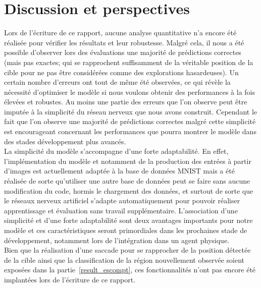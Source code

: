 
\chapter{Discussion et perspectives} %

\label{Discussion} %


Lors de l'écriture de ce rapport, aucune analyse quantitative n'a encore été réalisée pour vérifier les résultats et leur robustesse.
Malgré cela, il nous a été possible d'observer lors des évaluations une majorité de prédictions correctes (mais pas exactes; qui se rapprochent suffisamment de la véritable position de la cible pour ne pas être considérées comme des explorations hasardeuses).
Un certain nombre d'erreurs ont tout de même été observées, ce qui révèle la nécessité d'optimiser le modèle si nous voulons obtenir des performances à la fois élevées et robustes. 
Au moins une partie des erreurs que l'on observe peut être imputée à la simplicité du réseau nerveux que nous avons construit.
Cependant le fait que l'on observe une majorité de prédictions correctes malgré cette simplicité est encourageant concernant les performances que pourra montrer le modèle dans des stades développement plus avancés. \\
La simplicité du modèle s'accompagne d'une forte adaptabilité.
En effet, l'implémentation du modèle et notamment de la production des entrées à partir d'images est actuellement adaptée à la base de données MNIST mais a été réalisée de sorte qu'utiliser une autre base de données peut se faire sans aucune modification du code, hormis le chargement des données, et surtout de sorte que le réseaux nerveux artificiel s'adapte automatiquement pour pouvoir réaliser apprentissage et évaluation sans travail supplémentaire.
L'association d'une simplicité et d'une forte adaptabilité sont deux avantages importants pour notre modèle et ces caractéristiques seront primordiales dans les prochaines stade de développement, notamment lors de l'intégration dans un agent physique. \\
Bien que la réalisation d'une saccade pour se rapprocher de la position détectée de la cible ainsi que la classification de la région nouvellement observée soient exposées dans la partie~\ref{result_escompt}, ces fonctionnalités n'ont pas encore été implantées lors de l'écriture de ce rapport. \\

